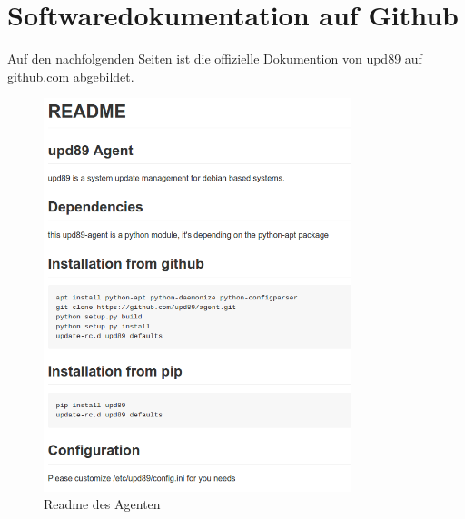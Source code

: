 \chapter{Softwaredokumentation auf Github} \label{appendix:documentation}

Auf den nachfolgenden Seiten ist die offizielle Dokumention von upd89 auf github.com abgebildet.



%

\begin{figure}
    \centering
    \includegraphics[width=0.8\textwidth]{fig/agent_readme}
    \caption{Readme des Agenten}
    \label{fig:appendix:documentation:agent}
\end{figure}